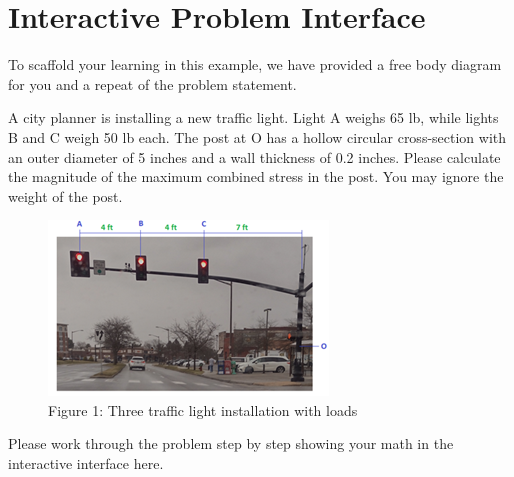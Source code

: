 \documentclass[
  letterpaper,
  DIV=11,
  numbers=noendperiod]{scrreprt}
\begin{document}
\chapter*{Interactive Problem
Interface}\label{interactive-problem-interface}


To scaffold your learning in this example, we have provided a free body
diagram for you and a repeat of the problem statement.

A city planner is installing a new traffic light. Light A weighs 65 lb,
while lights B and C weigh 50 lb each. The post at O has a hollow
circular cross-section with an outer diameter of 5 inches and a wall
thickness of 0.2 inches. Please calculate the magnitude of the maximum
combined stress in the post. You may ignore the weight of the post.

\begin{figure}[H]

{\centering \includegraphics{images/stoplights.png}

}

\caption{Figure 1: Three traffic light installation with loads}

\end{figure}%

Please work through the problem step by step showing your math in the
interactive interface here.
\end{document}
